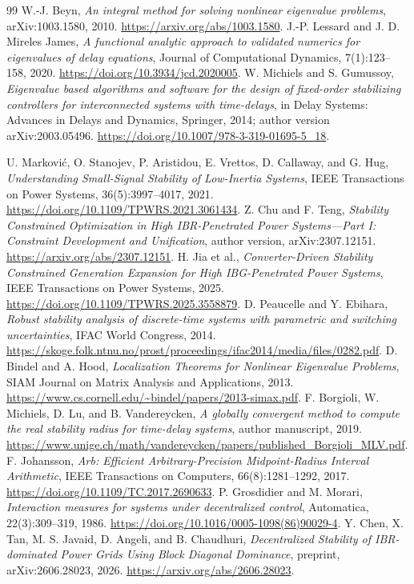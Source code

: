 \documentclass[11pt]{article}
\begin{document}
\begin{thebibliography}{99}
 W.-J. Beyn,
\emph{An integral method for solving nonlinear eigenvalue problems},
arXiv:1003.1580, 2010.
\url{https://arxiv.org/abs/1003.1580}.
 J.-P. Lessard and J. D. Mireles James,
\emph{A functional analytic approach to validated numerics for
eigenvalues of delay equations}, Journal of Computational Dynamics,
7(1):123--158, 2020.
\url{https://doi.org/10.3934/jcd.2020005}.
 W. Michiels and S. Gumussoy,
\emph{Eigenvalue based algorithms and software for the design of
fixed-order stabilizing controllers for interconnected systems with
time-delays}, in Delay Systems: Advances in Delays and Dynamics,
Springer, 2014; author version arXiv:2003.05496.
\url{https://doi.org/10.1007/978-3-319-01695-5_18}.

 U. Markovi\'c, O. Stanojev, P. Aristidou,
E. Vrettos, D. Callaway, and G. Hug,
\emph{Understanding Small-Signal Stability of Low-Inertia Systems},
IEEE Transactions on Power Systems, 36(5):3997--4017, 2021.
\url{https://doi.org/10.1109/TPWRS.2021.3061434}.
 Z. Chu and F. Teng,
\emph{Stability Constrained Optimization in High IBR-Penetrated
Power Systems---Part I: Constraint Development and Unification},
author version, arXiv:2307.12151.
\url{https://arxiv.org/abs/2307.12151}.
 H. Jia et al.,
\emph{Converter-Driven Stability Constrained Generation Expansion
for High IBG-Penetrated Power Systems},
IEEE Transactions on Power Systems, 2025.
\url{https://doi.org/10.1109/TPWRS.2025.3558879}.
 D. Peaucelle and Y. Ebihara,
\emph{Robust stability analysis of discrete-time systems with
parametric and switching uncertainties}, IFAC World Congress, 2014.
\url{https://skoge.folk.ntnu.no/prost/proceedings/ifac2014/media/files/0282.pdf}.
 D. Bindel and A. Hood,
\emph{Localization Theorems for Nonlinear Eigenvalue Problems},
SIAM Journal on Matrix Analysis and Applications, 2013.
\url{https://www.cs.cornell.edu/~bindel/papers/2013-simax.pdf}.
 F. Borgioli, W. Michiels, D. Lu, and B. Vandereycken,
\emph{A globally convergent method to compute the real stability
radius for time-delay systems}, author manuscript, 2019.
\url{https://www.unige.ch/math/vandereycken/papers/published_Borgioli_MLV.pdf}.
 F. Johansson,
\emph{Arb: Efficient Arbitrary-Precision Midpoint-Radius Interval
Arithmetic}, IEEE Transactions on Computers, 66(8):1281--1292, 2017.
\url{https://doi.org/10.1109/TC.2017.2690633}.
 P. Grosdidier and M. Morari,
\emph{Interaction measures for systems under decentralized control},
Automatica, 22(3):309--319, 1986.
\url{https://doi.org/10.1016/0005-1098(86)90029-4}.
 Y. Chen, X. Tan, M. S. Javaid, D. Angeli, and B. Chaudhuri,
\emph{Decentralized Stability of IBR-dominated Power Grids Using Block Diagonal Dominance},
preprint, arXiv:2606.28023, 2026.
\url{https://arxiv.org/abs/2606.28023}.


\end{thebibliography}
\end{document}
